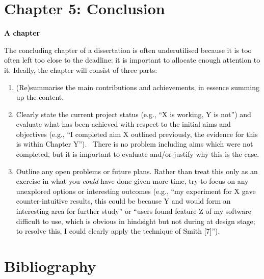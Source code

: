 \documentclass[a4paper]{article}
\newcommand\liststyleWWNumxx{%
\renewcommand\theenumi{\arabic{enumi}}
\renewcommand\labelenumi{\theenumi.}
\renewcommand\labelitemi{o}
\renewcommand\labelitemii{[F0A7?]}
\renewcommand\labelitemiii{[F0B7?]}
}
\begin{document}
\bigskip


\bigskip

\clearpage\section{Chapter 5: Conclusion}
\hypertarget{Toc98342038}{}
\bigskip

\textbf{\textcolor{black}{A chapter }}


\bigskip

\textcolor{black}{The concluding chapter of a dissertation is often underutilised because it is too often left too close
to the deadline: it is important to allocate enough attention to it. Ideally, the chapter will consist of three parts:}


\bigskip

\liststyleWWNumxx
\begin{enumerate}
\item \textcolor{black}{(Re)summarise the main contributions and achievements, in essence summing up the content.}
\item \textcolor{black}{Clearly state the current project status (e.g., ``X is working, Y is not'') and evaluate what
has been achieved with respect to the initial aims and objectives (e.g., ``I completed aim X outlined previously, the
evidence for this is within Chapter Y''). \ There is no problem including aims which were not completed, but it is
important to evaluate and/or justify why this is the case.}
\item \textcolor{black}{Outline any open problems or future plans. Rather than treat this only as an exercise in what
you }\textit{\textcolor{black}{could}}\textcolor{black}{ have done given more time, try to focus on any unexplored
options or interesting outcomes (e.g., ``my experiment for X gave counter-intuitive results, this could be because Y
and would form an interesting area for further study'' or ``users found feature Z of my software difficult to use,
which is obvious in hindsight but not during at design stage; to resolve this, I could clearly apply the technique of
Smith [7]'').}
\end{enumerate}

\bigskip


\bigskip

\clearpage
\bigskip

\section{Bibliography}
\hypertarget{Toc98342039}{}

\end{document}
